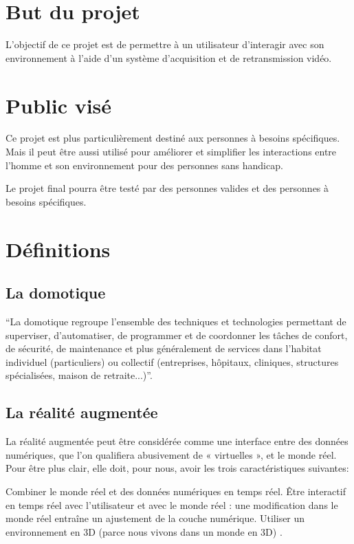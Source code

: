 \documentclass[12pt,a4paper]{article}
\begin{document}
\section{But du projet}

L'objectif de ce projet est de permettre à un utilisateur d'interagir avec son environnement à l'aide d'un système d'acquisition et de retransmission vidéo.

\section{Public visé}

Ce projet est plus particulièrement destiné aux personnes à besoins spécifiques. Mais il peut être aussi utilisé pour améliorer et simplifier les interactions entre l’homme et son environnement pour des personnes sans handicap.\par
Le projet final pourra être testé par des personnes valides et des personnes à besoins spécifiques.

\section{Définitions}

\subsection{La domotique}
``La domotique regroupe l'ensemble des techniques et technologies permettant de superviser, d'automatiser, de programmer et de coordonner les tâches de confort, de sécurité, de maintenance et plus généralement de services dans l'habitat individuel (particuliers) ou collectif (entreprises, hôpitaux, cliniques, structures spécialisées, maison de retraite...)''.\cite{Ref15}

\subsection{La réalité augmentée}
La réalité augmentée peut être considérée comme une interface entre des données numériques, que l’on qualifiera abusivement de « virtuelles », et le monde réel. Pour être plus clair, elle doit, pour nous, avoir les trois caractéristiques suivantes:

Combiner le monde réel et des données numériques en temps réel.
Être interactif en temps réel avec l’utilisateur et avec le monde réel : une modification dans le monde réel entraîne un ajustement de la couche numérique.
Utiliser un environnement en 3D (parce nous vivons dans un monde en 3D) \cite{Ref17}.
\end{document}
